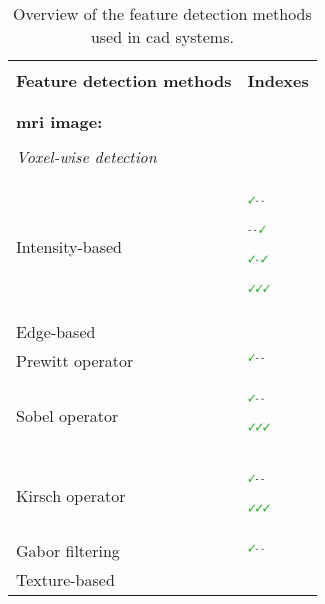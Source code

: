\thispagestyle{empty}
\begin{table*}
  \centering
  \caption{Overview of the feature detection methods used in \ac{cad} systems.}\label{tab:feat}
  \footnotesize
  \begin{threeparttable}
    \renewcommand{\arraystretch}{.7}
    \begin{tabular}{p{.5\linewidth} p{.4\linewidth}}
      \hline \\ [-1.5ex]
      \textbf{Feature detection methods} & \textbf{Indexes} \\ \\ [-1.5ex]
      \hline \\ [-1.5ex]
      \textbf{\ac{mri} image:} & \\ \\ [-1.5ex]
      \quad \textit{Voxel-wise detection} &  \\ \\ [-1.5ex]
      \quad \quad Intensity-based & $^{\text{{\cmarksmall}- -}}$\cite{Ampeliotis2007,Ampeliotis2008,Vos2008}\par $^{\text{- - {\cmarksmall}}}$\cite{Giannini2013}\par $^{\text{{\cmarksmall}- {\cmarksmall}}}$\cite{Artan2009,Artan2010,Chan2003,Langer2009,Litjens2011,Litjens2012,Litjens2014,Liu2009,Ozer2009,Ozer2010}\par $^{\text{{\cmarksmall}{\cmarksmall}{\cmarksmall}}}$\cite{Niaf2011,Niaf2012} \\ 
      \quad \quad Edge-based & \\
      \quad \quad \quad Prewitt operator & $^{\text{{\cmarksmall}- -}}$\cite{Tiwari2009a,Tiwari2010,Tiwari2013,Viswanath2008} \\
      \quad \quad \quad Sobel operator & $^{\text{{\cmarksmall}- -}}$\cite{Tiwari2009a,Tiwari2010,Tiwari2013,Viswanath2008,Viswanath2009,Viswanath2011,Viswanath2012}\par $^{\text{{\cmarksmall}{\cmarksmall}{\cmarksmall}}}$\cite{Niaf2011,Niaf2012} \\
      \quad \quad \quad Kirsch operator & $^{\text{{\cmarksmall}- -}}$\cite{Tiwari2009a,Tiwari2010,Tiwari2013,Viswanath2008,Viswanath2009,Viswanath2011,Viswanath2012}\par $^{\text{{\cmarksmall}{\cmarksmall}{\cmarksmall}}}$\cite{Niaf2011,Niaf2012} \\
      \quad \quad \quad Gabor filtering & $^{\text{{\cmarksmall}- -}}$\cite{Tiwari2012,Viswanath2008,Viswanath2012} \\ 
      \quad \quad Texture-based & \\

\end{tabular}
\end{threeparttable}
\end{table*}
